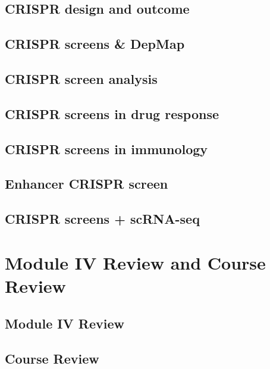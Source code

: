 \documentclass[
]{book}
\begin{document}
\hypertarget{crispr-design-and-outcome}{%
\section{CRISPR design and outcome}\label{crispr-design-and-outcome}}

\hypertarget{crispr-screens-depmap}{%
\section{CRISPR screens \& DepMap}\label{crispr-screens-depmap}}

\hypertarget{crispr-screen-analysis}{%
\section{CRISPR screen analysis}\label{crispr-screen-analysis}}

\hypertarget{crispr-screens-in-drug-response}{%
\section{CRISPR screens in drug response}\label{crispr-screens-in-drug-response}}

\hypertarget{crispr-screens-in-immunology}{%
\section{CRISPR screens in immunology}\label{crispr-screens-in-immunology}}

\hypertarget{enhancer-crispr-screen}{%
\section{Enhancer CRISPR screen}\label{enhancer-crispr-screen}}

\hypertarget{crispr-screens-scrna-seq}{%
\section{CRISPR screens + scRNA-seq}\label{crispr-screens-scrna-seq}}

\hypertarget{m4re}{%
\chapter{Module IV Review and Course Review}\label{m4re}}

\hypertarget{module-iv-review}{%
\section{Module IV Review}\label{module-iv-review}}

\hypertarget{course-review}{%
\section{Course Review}\label{course-review}}
\end{document}
